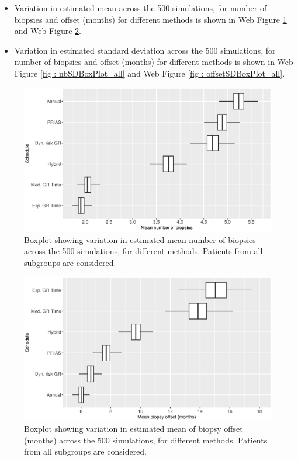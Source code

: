 \begin{itemize}
  \item Variation in estimated mean across the 500 simulations, for number of biopsies and offset (months) for different methods is shown in Web Figure \ref{fig : nbMeanBoxPlot_all} and Web Figure \ref{fig : offsetMeanBoxPlot_all}.
  \item Variation in estimated standard deviation across the 500 simulations, for number of biopsies and offset (months) for different methods is shown in Web Figure \ref{fig : nbSDBoxPlot_all} and Web Figure \ref{fig : offsetSDBoxPlot_all}.
\end{itemize}

\begin{figure}[!htb]
\centerline{\includegraphics[width=\columnwidth]{images/sim_study/nbMeanBoxPlot_all.eps}}
\caption{Boxplot showing variation in estimated mean number of biopsies across the 500 simulations, for different methods. Patients from all subgroups are considered.}
\label{fig : nbMeanBoxPlot_all}
\end{figure}

\begin{figure}[!htb]
\centerline{\includegraphics[width=\columnwidth]{images/sim_study/offsetMeanBoxPlot_all.eps}}
\caption{Boxplot showing variation in estimated mean of biopsy offset (months) across the 500 simulations, for different methods. Patients from all subgroups are considered.}
\label{fig : offsetMeanBoxPlot_all}
\end{figure}

